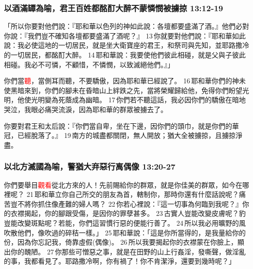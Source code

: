 \subsubsection{以酒滿罈為喻，君王百姓都酩酊大醉不蒙憐憫被擄掠 13:12-19}
「所以你要對他們說：『耶和華以色列的神如此說：各壇都要盛滿了酒。』他們必對你說：『我們豈不確知各壇都要盛滿了酒呢？』 13 你就要對他們說：『耶和華如此說：我必使這地的一切居民，就是坐大衛寶座的君王，和祭司與先知，並耶路撒冷的一切居民，都酩酊大醉。 14 耶和華說：我要使他們彼此相碰，就是父與子彼此相碰。我必不可憐，不顧惜，不憐憫，以致滅絕他們。』」

你們當\textcolor{red}{聽}，當側耳而聽，不要驕傲，因為耶和華已經說了。 16 耶和華你們的神未使黑暗來到，你們的腳未在昏暗山上絆跌之先，當將榮耀歸給他，免得你們盼望光明，他使光明變為死蔭成為幽暗。 17 你們若不聽這話，我必因你們的驕傲在暗地哭泣，我眼必痛哭流淚，因為耶和華的群眾被擄去了。

你要對君王和太后說：『你們當自卑，坐在下邊，因你們的頭巾，就是你們的華冠，已經脫落了。』 19 南方的城盡都關閉，無人開放；猶大全被擄掠，且擄掠淨盡。

\subsubsection{以北方滅國為喻，警猶大弃惡行离偶像 13:20-27}
你們要舉目\textcolor{red}{觀看}從北方來的人！先前賜給你的群眾，就是你佳美的群眾，如今在哪裡呢？ 21 耶和華立你自己所交的朋友為首，轄制你，那時你還有什麼話說呢？痛苦豈不將你抓住像產難的婦人嗎？ 22 你若心裡說：『這一切事為何臨到我呢？』你的衣襟揭起，你的腳跟受傷，是因你的罪孽甚多。 23 古實人豈能改變皮膚呢？豹豈能改變斑點呢？若能，你們這習慣行惡的便能行善了。 24 所以我必用曠野的風吹散他們，像吹過的碎秸一樣。」 
25 耶和華說：「這是你所當得的，是我量給你的份，因為你忘記我，倚靠虛假(偶像)。 26 所以我要揭起你的衣襟蒙在你臉上，顯出你的醜陋。 27 你那些可憎惡之事，就是在田野的山上行姦淫，發嘶聲，做淫亂的事，我都看見了。耶路撒冷啊，你有禍了！你不肯潔淨，還要到幾時呢？」

